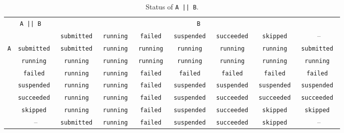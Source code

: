 \documentclass[a4paper,12pt,english,oneside]{book}
\begin{document}
\begin{landscape}
\begin{table}
	\centering
	\begin{tabular}{c|c|ccccccc}
		\toprule
		\multicolumn{2}{c|}{\multirow{2}{*}{\tt A || B}} & \multicolumn{7}{c}{\tt B} \\
		\cmidrule(rl){3-9}
		\multicolumn{2}{c|}{} & \tt submitted & \tt running & \tt failed   & \tt suspended & \tt succeeded  & \tt skipped & \rm -- \\
		\midrule
		\multirow{6}{*}{\tt A}
		& \tt submitted & \tt submitted & \tt running & \tt running & \tt running   & \tt running   & \tt running   & \tt submitted \\
		& \tt running   & \tt running   & \tt running & \tt running & \tt running   & \tt running   & \tt running   & \tt running   \\
		& \tt failed    & \tt running   & \tt running & \tt failed  & \tt failed    & \tt failed    & \tt failed    & \tt failed    \\
		& \tt suspended & \tt running   & \tt running & \tt failed  & \tt suspended & \tt suspended & \tt suspended & \tt suspended \\
		& \tt succeeded & \tt running   & \tt running & \tt failed  & \tt suspended & \tt succeeded & \tt succeeded & \tt succeeded \\
		& \tt skipped   & \tt running   & \tt running & \tt failed  & \tt suspended & \tt succeeded & \tt skipped   & \tt skipped   \\
		& \rm --        & \tt submitted & \tt running & \tt failed  & \tt suspended & \tt succeeded & \tt skipped   & \rm --        \\
		\bottomrule
	\end{tabular}
	\caption{Status of \texttt{A || B}.}
\end{table}
\begin{table}
	\centering
	\begin{tabular}{c|c|cccccc}

\end{tabular}
\end{table}
\end{landscape}
\end{document}
